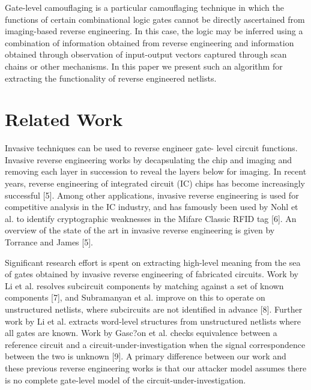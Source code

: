 \documentclass[proposal]{umassthesis}  %
\begin{document}
    Gate-level camouflaging is a particular camouflaging technique in which the functions of certain combinational logic gates cannot be directly ascertained from imaging-based reverse engineering. In this case, the logic may be inferred using a combination of information obtained from reverse engineering and information obtained through observation of input-output vectors captured through scan chains or other mechanisms. In this paper we present such an algorithm for extracting the functionality of reverse engineered netlists.






















\chapter{Related Work}

Invasive techniques can be used to reverse engineer gate- level circuit functions. Invasive reverse engineering works by decapsulating the chip and imaging and removing each layer in succession to reveal the layers below for imaging. In recent years, reverse engineering of integrated circuit (IC) chips has become increasingly successful [5]. Among other applications, invasive reverse engineering is used for competitive analysis in the IC industry, and has famously been used by Nohl et al. to identify cryptographic weaknesses in the Mifare Classic RFID tag [6]. An overview of the state of the art in invasive reverse engineering is given by Torrance and James [5].

Significant research effort is spent on extracting high-level meaning from the sea of gates obtained by invasive reverse engineering of fabricated circuits. Work by Li et al. resolves subcircuit components by matching against a set of known components [7], and Subramanyan et al. improve on this to operate on unstructured netlists, where subcircuits are not identified in advance [8]. Further work by Li et al. extracts word-level structures from unstructured netlists where all gates are known. Work by Gasc?on et al. checks equivalence between a reference circuit and a circuit-under-investigation when the signal correspondence between the two is unknown [9]. A primary difference between our work and these previous reverse engineering works is that our attacker model assumes there is no complete gate-level model of the circuit-under-investigation.
\end{document}
